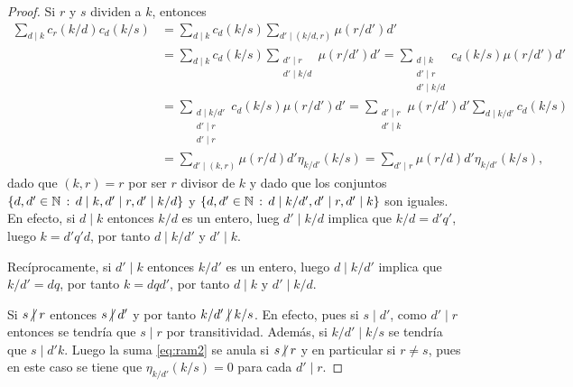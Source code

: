 \begin{proof}
Si $r$ y $s$ dividen a $k$, entonces
\begin{equation} \label{eq:ram2}
\begin{split}
\sum_{d \mid k} c_r (k/d) c_d (k/s) &= \sum_{d \mid k} c_d (k/s) \sum_{d' \mid (k/d,r)} \mu (r/d') d' \\
                                                                              &= \sum_{d \mid k} c_d (k/s) \sum_{\substack{d' \mid r \\ d' \mid k/d}} \mu(r/d') d' = \sum_{\substack{d \mid k \\ d' \mid r \\ d' \mid k/d}} c_d (k/s) \mu (r/d') d' \\
                                                                              &= \sum_{\substack{d \mid k/d' \\ d' \mid r \\ d' \mid r}} c_d(k/s) \mu(r/d')  d' = \sum_{\substack{d' \mid r \\ d' \mid k}} \mu(r/d') d' \sum_{d \mid k/d'} c_d(k/s) \\
                                                                              &= \sum_{d' \mid (k,r)} \mu(r/d) d' \eta_{k/d'} (k/s) = \sum_{d' \mid r} \mu(r/d) d' \eta_{k/d'} (k/s),
\end{split}
\end{equation}
dado que $(k,r)=r$ por ser $r$ divisor de $k$ y dado que los conjuntos $\{ d,d' \in \mathbb{N} \, : \, d \mid k, d' \mid r, d' \mid k/d \}$ y $\{ d,d' \in \mathbb{N} \, : \, d \mid k/d', d' \mid r, d' \mid k \}$ son iguales. En efecto, si $d \mid k$ entonces $k/d$ es un entero, lueg $d' \mid k/d$ implica que $k/d=d' q'$, luego $k=d' q' d$, por tanto $d \mid k/d'$ y $d' \mid k$.
\bigskip

Recíprocamente, si $d' \mid k$ entonces $k/d'$ es un entero, luego $d \mid k/d'$ implica que $k/d'=dq$, por tanto $k=d q d'$, por tanto $d \mid k$ y $d' \mid k/d$.
\bigskip

Si $s \centernot\mid r$ entonces $s \centernot\mid d'$ y por tanto $k/d' \centernot\mid k/s$. En efecto, pues si $s \mid d'$, como $d' \mid r$ entonces se tendría que $s \mid r$ por transitividad. Además, si $k/d' \mid k/s$ se tendría que $s \mid d'k$. Luego la suma \eqref{eq:ram2} se anula si $s \centernot\mid r$ y en particular si $r \ne s$, pues en este caso se tiene que $\eta_{k/d'}(k/s)=0$ para cada $d' \mid r$. 
\bigskip


\end{proof}
